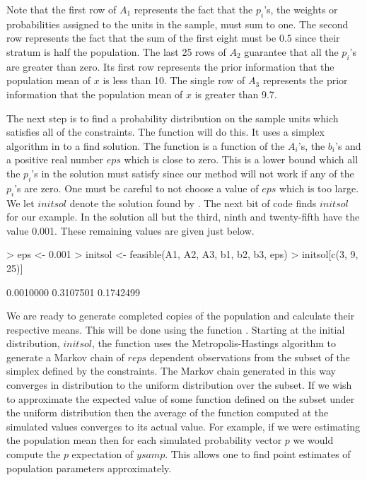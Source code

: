 \documentclass{article}
\begin{document}
Note that the first row of $A_1$ represents the fact that the $p_i$'s,
 the weights or probabilities assigned to the units in the sample,
must sum to one. The second row represents the fact that the 
sum of the first eight must be 0.5 since their stratum is half 
the population. The last 25 rows of $A_2$  guarantee
that all the $p_i$'s are greater than zero. Its first row represents 
the prior information that the population mean of $x$ is less than 10.
The single row of $A_3$ represents the prior information that the 
population mean of $x$ is greater than 9.7.

The next step is to find a probability distribution on the 
sample units which satisfies all of the constraints. The function
\verb@feasible@ will do this. It uses a simplex algorithm in \verb@R@ to 
a find solution. The function \verb@feasible@ is a function of the 
$A_i$'s, the $b_i$'s and a positive real number $eps$ which is 
close to zero. This is a lower bound which all the $p_i$'s 
in the solution must satisfy since our method will not work 
if any of the $p_i$'s are zero. One must be careful to not choose 
a value of $eps$ which is too large. We let $initsol$ denote 
the solution found by \verb@feasible@. The next bit of code finds 
$initsol$ for our example. In the solution all but the 
third, ninth and twenty-fifth have the value 0.001. These 
remaining values are given just below.  

\begin{Schunk}
\begin{Sinput}
> eps <- 0.001
> initsol <- feasible(A1, A2, A3, b1, b2, b3, eps)
> initsol[c(3, 9, 25)]
\end{Sinput}
\begin{Soutput}
[1] 0.0010000 0.3107501 0.1742499
\end{Soutput}
\end{Schunk}

We are ready to generate completed copies of the population and 
calculate their respective means. This will be done using
the function \verb@constrppmn@. 
Starting at the initial distribution, $initsol$, the function 
\verb@constrppmn@ uses the Metropolis-Hastings algorithm  to generate 
a Markov chain of $reps$ dependent observations from the subset of the 
 simplex defined by the constraints.
The Markov chain generated in this way converges in
distribution to the uniform distribution over the subset.
If we wish to approximate the expected
value of some function defined on the subset under the 
uniform distribution then the average
of the function computed at the simulated values converges to its
actual value. For example, if we were estimating the population mean 
then for each simulated probability vector $p$ we would compute 
the $p$ expectation of $ysamp$.
This allows one to find point estimates of
population parameters approximately. 
\end{document}
